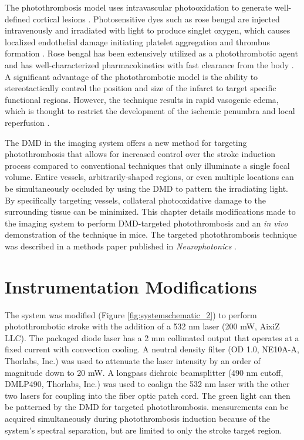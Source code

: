 The photothrombosis model uses intravascular photooxidation to generate well-defined cortical lesions \cite{Watson:1985bp}. Photosensitive dyes such as rose bengal are injected intravenously and irradiated with light to produce singlet oxygen, which causes localized endothelial damage initiating platelet aggregation and thrombus formation \cite{Dietrich:1987wh}. Rose bengal has been extensively utilized as a photothrombotic agent \cite{Grome:1988bx, Parthasarathy:2010vo} and has well-characterized pharmacokinetics with fast clearance from the body \cite{Klaassen:1976kg}. A significant advantage of the photothrombotic model is the ability to stereotactically control the position and size of the infarct to target specific functional regions. However, the technique results in rapid vasogenic edema, which is thought to restrict the development of the ischemic penumbra and local reperfusion \cite{Carmichael:2005gk}.

The DMD in the imaging system offers a new method for targeting photothrombosis that allows for increased control over the stroke induction process compared to conventional techniques that only illuminate a single focal volume. Entire vessels, arbitrarily-shaped regions, or even multiple locations can be simultaneously occluded by using the DMD to pattern the irradiating light. By specifically targeting vessels, collateral photooxidative damage to the surrounding tissue can be minimized. This chapter details modifications made to the imaging system to perform DMD-targeted photothrombosis and an \textit{in vivo} demonstration of the technique in mice. The targeted photothrombosis technique was described in a methods paper published in \textit{Neurophotonics} \cite{Sullender:2018ff}.



\section{Instrumentation Modifications}

The system was modified (Figure \ref{fig:systemschematic_2}) to perform photothrombotic stroke with the addition of a 532 nm laser (200 mW, AixiZ LLC). The packaged diode laser has a 2 mm collimated output that operates at a fixed current with convection cooling. A neutral density filter (OD 1.0, NE10A-A, Thorlabs, Inc.) was used to attenuate the laser intensity by an order of magnitude down to 20 mW. A longpass dichroic beamsplitter (490 nm cutoff, DMLP490, Thorlabs, Inc.) was used to coalign the 532 nm laser with the other two lasers for coupling into the fiber optic patch cord. The green light can then be patterned by the DMD for targeted photothrombosis.  measurements can be acquired simultaneously during photothrombosis induction because of the system's spectral separation, but are limited to only the stroke target region.

